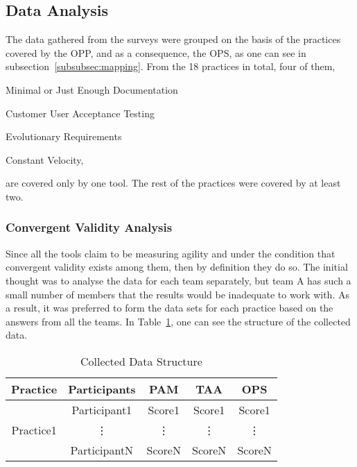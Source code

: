 \subsection{Data Analysis}

The data gathered from the surveys were grouped on the basis of the practices covered by the \ac{OPP}, and as a consequence, the \ac{OPS}, as one can see in subsection~\ref{subsubsec:mapping}. From the 18 practices in total, four of them, \begin{inparaenum} [a\upshape)] \item Minimal or Just Enough Documentation \item Customer User Acceptance Testing \item Evolutionary Requirements \item Constant Velocity, \end{inparaenum} are covered only by one tool. The rest of the practices were covered by at least two.

\subsubsection{Convergent Validity Analysis}
\label{subsubsec:convergent_validity_analysis}
Since all the tools claim to be measuring agility and under the condition that convergent validity exists among them, then by definition they do so. The initial thought was to analyse the data for each team separately, but team A has such a small number of members that the results would be inadequate to work with. As a result, it was preferred to form the data sets for each practice based on the answers from all the teams. In Table~\ref{table:data_structure}, one can see the structure of the collected data.

\begin{table} [H]
	\caption{Collected Data Structure}
	\label{table:data_structure}
	\begin{tabular}{| c | c | c | c | c |} \hline
	\textbf{Practice} & \textbf{Participants} & \textbf{\ac{PAM}} & \textbf{\ac{TAA}} & \textbf{\ac{OPS}} \\ \hline
	\multirow{3}{*}{Practice1} & Participant1 & Score1 & Score1 & Score1 \\ \hhline{~----}
	& \vdots & \vdots & \vdots  & \vdots \\ \hhline{~----}
	& ParticipantN & ScoreN & ScoreN & ScoreN \\ \hline
	\end{tabular}
\end{table}


